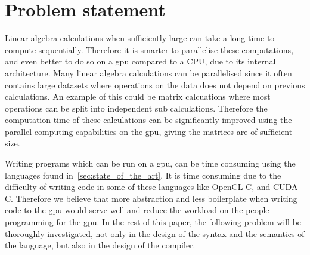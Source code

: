 \newpage
\section{Problem statement}
\label{sec:problem}

Linear algebra calculations when sufficiently large can take a long time to compute sequentially. 
Therefore it is smarter to parallelise these computations, and even better to do so on a \acrshort{gpu} compared to a CPU, due to its internal architecture.
Many linear algebra calculations can be parallelised since it often contains large datasets where operations on the data does not depend on previous calculations.
An example of this could be matrix calcuations where most operations can be split into independent sub calculations.
Therefore the computation time of these calculations can be significantly improved using the parallel computing capabilities on the \acrshort{gpu}, giving the matrices are of sufficient size.

Writing programs which can be run on a \acrshort{gpu}, can be time consuming using the languages found in~\ref{sec:state_of_the_art}.
It is time consuming due to the difficulty of writing code in some of these languages like OpenCL C, and CUDA C.
Therefore we believe that more abstraction and less boilerplate when writing code to the \acrshort{gpu} would serve well and reduce the workload on the people programming for the \acrshort{gpu}.
In the rest of this paper, the following problem will be thoroughly investigated, not only in the design of the syntax and the semantics of the language, but also in the design of the compiler.

